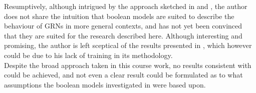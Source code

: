 \documentclass[11pt]{article}
\begin{document}
Resumptively, although intrigued by the approach sketched in \cite{Wittmann} and \cite{Krumsiek}, the author does not share the intuition that boolean models are suited to describe the behaviour of GRNs in more general contexts, and has not yet been convinced that they are suited for the research described here. 
Although interesting and promising, the author is left sceptical of the results presented in \cite{Kirkham}, which however could be due to his lack of training in its methodology. \\

Despite the broad approach taken in this course work, no results consistent with \cite{Kirkham} could be achieved, and not even a clear result could be formulated as to what assumptions the boolean models investigated in \cite{Kirkham} were based upon.
\end{document}
